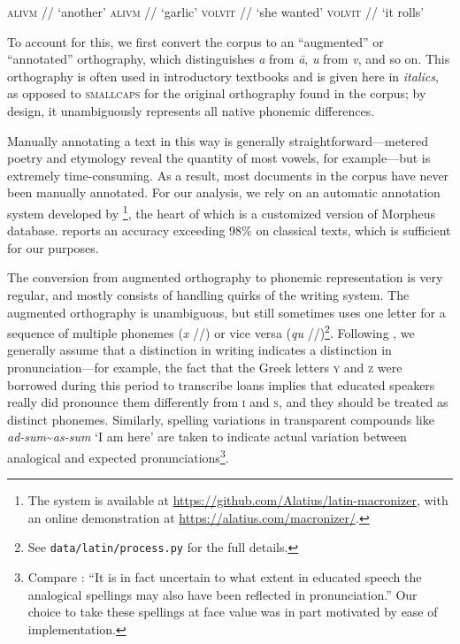 \documentclass[12pt,twoside]{article}
\newcommand{\ipa}[1]{/\textipa{#1}/}
\begin{document}
\begin{exe}
\ex \textsc{alivm} \ipa{a.li.um} `another'
\ex \textsc{alivm} \ipa{a:.li.um} `garlic'
\ex \textsc{volvit} \ipa{wo.lu.it} `she wanted'
\ex \textsc{volvit} \ipa{wol.wit} `it rolls'
\end{exe}

To account for this, we first convert the corpus to an ``augmented'' or ``annotated'' orthography, which distinguishes \emph{a} from \emph{\=a}, \emph{u} from \emph{v}, and so on. This orthography is often used in introductory textbooks and is given here in \emph{italics}, as opposed to \textsc{smallcaps} for the original orthography found in the corpus; by design, it unambiguously represents all native phonemic differences.

Manually annotating a text in this way is generally straightforward---metered poetry and etymology reveal the quantity of most vowels, for example---but is extremely time-consuming. As a result, most documents in the corpus have never been manually annotated. For our analysis, we rely on an automatic annotation system developed by \citet{winge}\footnote{The system is available at \url{https://github.com/Alatius/latin-macronizer}, with an online demonstration at \url{https://alatius.com/macronizer/}.}, the heart of which is a customized version of  Morpheus database. \citet[27]{winge} reports an accuracy exceeding 98\% on classical texts, which is sufficient for our purposes.


The conversion from augmented orthography to phonemic representation is very regular, and mostly consists of handling quirks of the writing system. The augmented orthography is unambiguous, but still sometimes uses one letter for a sequence of multiple phonemes (\emph{x} \ipa{ks}) or vice versa (\emph{qu} \ipa{k\super{w}})\footnote{See \texttt{data/latin/process.py} for the full details.}. Following \citet{allen}, we generally assume that a distinction in writing indicates a distinction in pronunciation---for example, the fact that the Greek letters \textsc{y} and \textsc{z} were borrowed during this period to transcribe loans implies that educated speakers really did pronounce them differently from \textsc{i} and \textsc{s}, and they should be treated as distinct phonemes. Similarly, spelling variations in transparent compounds like \emph{ad-sum}\textasciitilde\emph{as-sum} `I am here' are taken to indicate actual variation between analogical and expected pronunciations\footnote{Compare \citet[22]{allen}: ``It is in fact uncertain to what extent in educated speech the analogical spellings may also have been reflected in pronunciation.'' Our choice to take these spellings at face value was in part motivated by ease of implementation.}.
\end{document}
